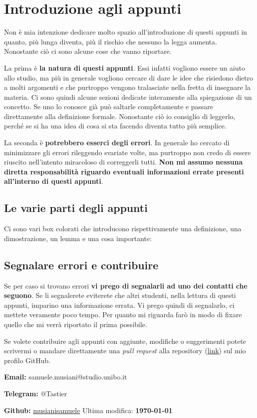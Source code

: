 \section{Introduzione agli appunti}

Non è mia intenzione dedicare molto spazio all'introduzione di questi appunti in quanto, più lunga diventa, più il rischio che nessuno la legga aumenta. Nonostante ciò ci sono alcune cose che vanno riportare. 

La prima è \textbf{la natura di questi appunti}. Essi infatti vogliono essere un aiuto allo studio, ma più in generale vogliono cercare di dare le idee che risiedono dietro a molti argomenti e che purtroppo vengono tralasciate nella fretta di insegnare la materia. Ci sono quindi alcune sezioni dedicate interamente alla spiegazione di un concetto. Se uno lo conosce già può saltarle completamente e passare direttamente alla definizione formale. Nonostante ciò io consiglio di leggerlo, perché se si ha una idea di cosa si sta facendo diventa tutto più semplice.\bigbreak

La seconda è \textbf{potrebbero esserci degli errori}. In generale ho cercato di minimizzare gli errori rileggendo svariate volte, ma purtroppo non credo di essere riuscito nell'intento miracoloso di correggerli tutti. \textbf{Non mi assumo nessuna diretta responsabilità riguardo eventuali informazioni errate presenti all'interno di questi appunti}.

\subsection{Le varie parti degli appunti}
Ci sono vari box colorati che introducono rispettivamente una definizione, una dimostrazione, un lemma e una cosa importante:






\subsection{Segnalare errori e contribuire}
Se per caso si trovano errori \textbf{vi prego di segnalarli ad uno dei contatti che seguono}. Se li segnalerete eviterete che altri studenti, nella lettura di questi appunti, imparino una informazione errata. Vi prego quindi di segnalarlo, ci mettete veramente poco tempo. Per quanto mi riguarda farò in modo di fixare quello che mi verrà riportato il prima possibile.\bigbreak

Se volete contribuire agli appunti con aggiunte, modifiche o suggerimenti potete scrivermi o mandare direttamente una \textit{pull request} alla repository (\href{https://github.com/musianisamuele/Analisi}{link}) sul mio profilo GitHub.\bigbreak


\textbf{Email:} samuele.musiani@studio.unibo.it\bigbreak

\textbf{Telegram:} @Tastier\bigbreak

\textbf{Github:} \href{https://github.com/musianisamuele}{musianisamuele}
\hfill Ultima modifica: \textbf{\today}
